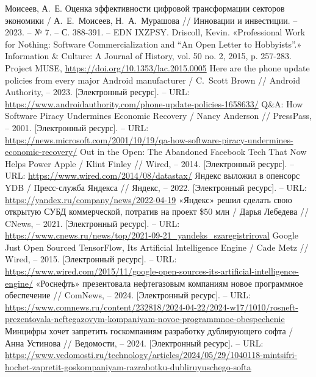\documentclass{article}
\begin{document}
\begin{thebibliography}{2}
 Моисеев, А.~Е. Оценка эффективности цифровой трансформации секторов экономики / А.~Е.~Моисеев, Н.~А.~Мурашова // Инновации и инвестиции. – 2023. – № 7. – С. 388-391. – EDN IXZPSY.
 Driscoll, Kevin. «Professional Work for Nothing: Software Commercialization and “An Open Letter to Hobbyists”.» Information \& Culture: A Journal of History, vol. 50 no. 2, 2015, p. 257-283. Project MUSE, \url{https://doi.org/10.1353/lac.2015.0005}
 Here are the phone update policies from every major Android manufacturer / C.~Scott Brown // Android Authority, – 2023. [Электронный ресурс]. – URL: \url{https://www.androidauthority.com/phone-update-policies-1658633/}
 Q\&A: How Software Piracy Undermines Economic Recovery / Nancy Anderson // PressPass, – 2001. [Электронный ресурс]. – URL: \url{https://news.microsoft.com/2001/10/19/qa-how-software-piracy-undermines-economic-recovery/}
 Out in the Open: The Abandoned Facebook Tech That Now Helps Power Apple / Klint Finley // Wired, – 2014. [Электронный ресурс]. – URL: \url{https://www.wired.com/2014/08/datastax/}
 Яндекс выложил в опенсорс YDB / Пресс-служба Яндекса // Яндекс, – 2022. [Электронный ресурс]. – URL: \url{https://yandex.ru/company/news/2022-04-19}
 «Яндекс» решил сделать свою открытую СУБД коммерческой, потратив на проект \$50 млн / Дарья Лебедева // CNews, – 2021. [Электронный ресурс]. – URL: \url{https://www.cnews.ru/news/top/2021-09-21\_yandeks\_szaregistriroval}
 Google Just Open Sourced TensorFlow, Its Artificial Intelligence Engine / Cade Metz // Wired, – 2015. [Электронный ресурс]. – URL: \url{https://www.wired.com/2015/11/google-open-sources-its-artificial-intelligence-engine/}
 «Роснефть» презентовала нефтегазовым компаниям новое программное обеспечение // ComNews, – 2024. [Электронный ресурс]. – URL: \url{https://www.comnews.ru/content/232818/2024-04-22/2024-w17/1010/rosneft-prezentovala-neftegazovym-kompaniyam-novoe-programmnoe-obespechenie}
 Минцифры хочет запретить госкомпаниям разработку дублирующего софта / Анна Устинова // Ведомости, – 2024. [Электронный ресурс]. – URL: \url{https://www.vedomosti.ru/technology/articles/2024/05/29/1040118-mintsifri-hochet-zapretit-goskompaniyam-razrabotku-dubliruyuschego-softa}

\end{thebibliography}
\end{document}

